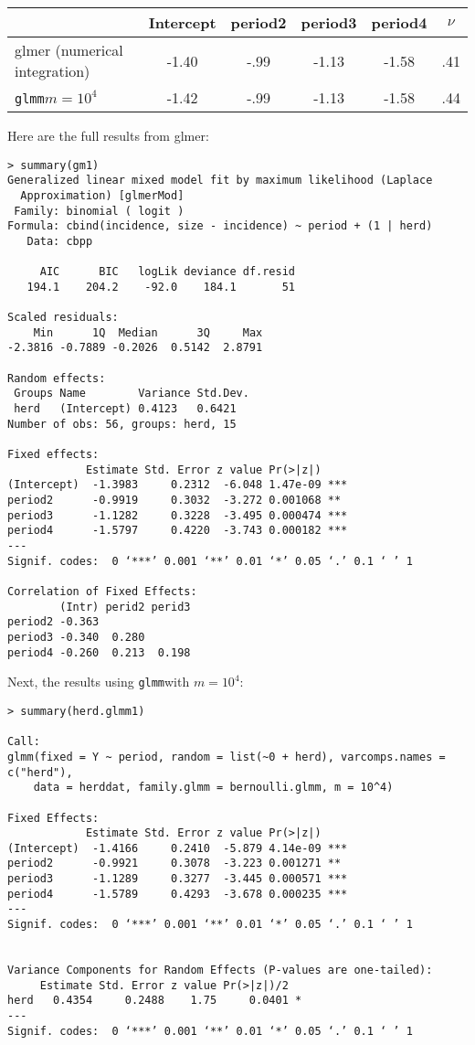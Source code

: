 \documentclass{article}
\begin{document}
\begin{tabular}{lccccc}
& Intercept & period2 & period3 & period4 & $\nu$ \\ \hline
glmer (numerical integration) & -1.40 & -.99 & -1.13 & -1.58 & .41\\
\texttt{glmm}$m=10^4$ & -1.42 & -.99 & -1.13 & -1.58 & .44 \\
\end{tabular}


Here are the full results from glmer:
\begin{verbatim}
> summary(gm1)
Generalized linear mixed model fit by maximum likelihood (Laplace
  Approximation) [glmerMod]
 Family: binomial ( logit )
Formula: cbind(incidence, size - incidence) ~ period + (1 | herd)
   Data: cbpp

     AIC      BIC   logLik deviance df.resid 
   194.1    204.2    -92.0    184.1       51 

Scaled residuals: 
    Min      1Q  Median      3Q     Max 
-2.3816 -0.7889 -0.2026  0.5142  2.8791 

Random effects:
 Groups Name        Variance Std.Dev.
 herd   (Intercept) 0.4123   0.6421  
Number of obs: 56, groups: herd, 15

Fixed effects:
            Estimate Std. Error z value Pr(>|z|)    
(Intercept)  -1.3983     0.2312  -6.048 1.47e-09 ***
period2      -0.9919     0.3032  -3.272 0.001068 ** 
period3      -1.1282     0.3228  -3.495 0.000474 ***
period4      -1.5797     0.4220  -3.743 0.000182 ***
---
Signif. codes:  0 ‘***’ 0.001 ‘**’ 0.01 ‘*’ 0.05 ‘.’ 0.1 ‘ ’ 1

Correlation of Fixed Effects:
        (Intr) perid2 perid3
period2 -0.363              
period3 -0.340  0.280       
period4 -0.260  0.213  0.198

\end{verbatim}

Next, the results using \texttt{glmm}with $m=10^4$:
\begin{verbatim}
> summary(herd.glmm1)

Call:
glmm(fixed = Y ~ period, random = list(~0 + herd), varcomps.names = c("herd"), 
    data = herddat, family.glmm = bernoulli.glmm, m = 10^4)

Fixed Effects:
            Estimate Std. Error z value Pr(>|z|)    
(Intercept)  -1.4166     0.2410  -5.879 4.14e-09 ***
period2      -0.9921     0.3078  -3.223 0.001271 ** 
period3      -1.1289     0.3277  -3.445 0.000571 ***
period4      -1.5789     0.4293  -3.678 0.000235 ***
---
Signif. codes:  0 ‘***’ 0.001 ‘**’ 0.01 ‘*’ 0.05 ‘.’ 0.1 ‘ ’ 1


Variance Components for Random Effects (P-values are one-tailed):
     Estimate Std. Error z value Pr(>|z|)/2  
herd   0.4354     0.2488    1.75     0.0401 *
---
Signif. codes:  0 ‘***’ 0.001 ‘**’ 0.01 ‘*’ 0.05 ‘.’ 0.1 ‘ ’ 1

\end{verbatim}
\end{document}
